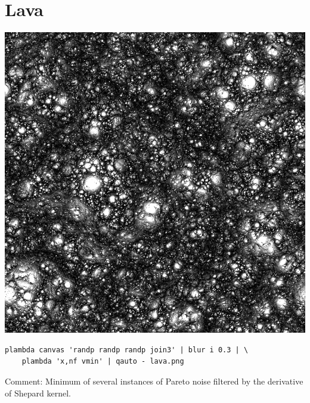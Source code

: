 \section{Lava}
\includegraphics{lava.png}
\begin{verbatim}
plambda canvas 'randp randp randp join3' | blur i 0.3 | \
	plambda 'x,nf vmin' | qauto - lava.png
\end{verbatim}
Comment: Minimum of several instances of Pareto noise filtered by the
derivative of Shepard kernel.

